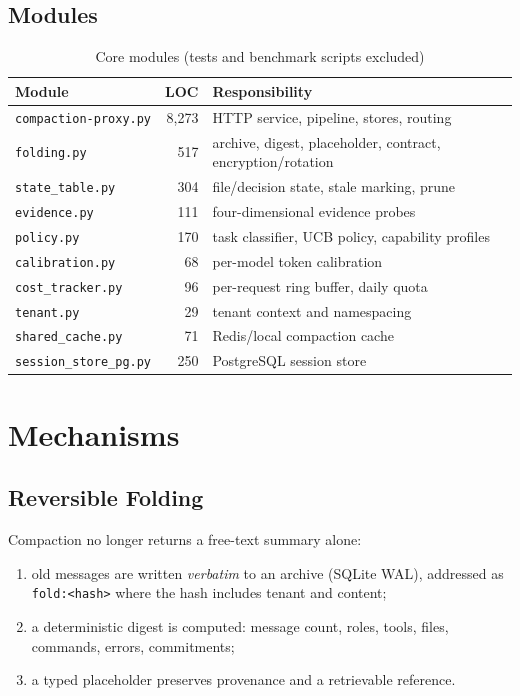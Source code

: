 \documentclass[11pt,a4paper]{article}
\begin{document}
\subsection{Modules}
\begin{table}[htbp]
\centering
\caption{Core modules (tests and benchmark scripts excluded)}
\begin{tabular}{lrl}
\toprule
Module & LOC & Responsibility \\
\midrule
\texttt{compaction-proxy.py} & 8,273 & HTTP service, pipeline, stores, routing \\
\texttt{folding.py} & 517 & archive, digest, placeholder, contract, encryption/rotation \\
\texttt{state\_table.py} & 304 & file/decision state, stale marking, prune \\
\texttt{evidence.py} & 111 & four-dimensional evidence probes \\
\texttt{policy.py} & 170 & task classifier, UCB policy, capability profiles \\
\texttt{calibration.py} & 68 & per-model token calibration \\
\texttt{cost\_tracker.py} & 96 & per-request ring buffer, daily quota \\
\texttt{tenant.py} & 29 & tenant context and namespacing \\
\texttt{shared\_cache.py} & 71 & Redis/local compaction cache \\
\texttt{session\_store\_pg.py} & 250 & PostgreSQL session store \\
\bottomrule
\end{tabular}
\end{table}

\section{Mechanisms}

\subsection{Reversible Folding}
Compaction no longer returns a free-text summary alone:
\begin{enumerate}
  \item old messages are written \emph{verbatim} to an archive (SQLite WAL), addressed as \texttt{fold:<hash>} where the hash includes tenant and content;
  \item a deterministic digest is computed: message count, roles, tools, files, commands, errors, commitments;
  \item a typed placeholder preserves provenance and a retrievable reference.
\end{enumerate}
\end{document}
